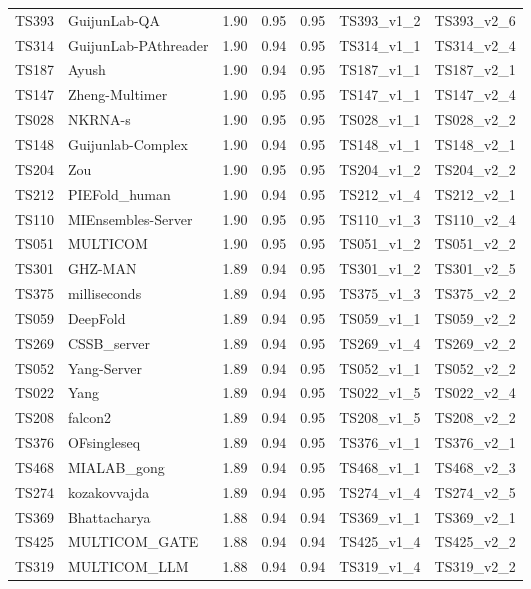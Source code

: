 \begin{longtable}{lllllll}
TS393 & GuijunLab-QA & 1.90 & 0.95 & 0.95 & TS393\_v1\_2 & TS393\_v2\_6 \\ 
TS314 & GuijunLab-PAthreader & 1.90 & 0.94 & 0.95 & TS314\_v1\_1 & TS314\_v2\_4 \\ 
TS187 & Ayush & 1.90 & 0.94 & 0.95 & TS187\_v1\_1 & TS187\_v2\_1 \\ 
TS147 & Zheng-Multimer & 1.90 & 0.95 & 0.95 & TS147\_v1\_1 & TS147\_v2\_4 \\ 
TS028 & NKRNA-s & 1.90 & 0.95 & 0.95 & TS028\_v1\_1 & TS028\_v2\_2 \\ 
TS148 & Guijunlab-Complex & 1.90 & 0.94 & 0.95 & TS148\_v1\_1 & TS148\_v2\_1 \\ 
TS204 & Zou & 1.90 & 0.95 & 0.95 & TS204\_v1\_2 & TS204\_v2\_2 \\ 
TS212 & PIEFold\_human & 1.90 & 0.94 & 0.95 & TS212\_v1\_4 & TS212\_v2\_1 \\ 
TS110 & MIEnsembles-Server & 1.90 & 0.95 & 0.95 & TS110\_v1\_3 & TS110\_v2\_4 \\ 
TS051 & MULTICOM & 1.90 & 0.95 & 0.95 & TS051\_v1\_2 & TS051\_v2\_2 \\ 
TS301 & GHZ-MAN & 1.89 & 0.94 & 0.95 & TS301\_v1\_2 & TS301\_v2\_5 \\ 
TS375 & milliseconds & 1.89 & 0.94 & 0.95 & TS375\_v1\_3 & TS375\_v2\_2 \\ 
TS059 & DeepFold & 1.89 & 0.94 & 0.95 & TS059\_v1\_1 & TS059\_v2\_2 \\ 
TS269 & CSSB\_server & 1.89 & 0.94 & 0.95 & TS269\_v1\_4 & TS269\_v2\_2 \\ 
TS052 & Yang-Server & 1.89 & 0.94 & 0.95 & TS052\_v1\_1 & TS052\_v2\_2 \\ 
TS022 & Yang & 1.89 & 0.94 & 0.95 & TS022\_v1\_5 & TS022\_v2\_4 \\ 
TS208 & falcon2 & 1.89 & 0.94 & 0.95 & TS208\_v1\_5 & TS208\_v2\_2 \\ 
TS376 & OFsingleseq & 1.89 & 0.94 & 0.95 & TS376\_v1\_1 & TS376\_v2\_1 \\ 
TS468 & MIALAB\_gong & 1.89 & 0.94 & 0.95 & TS468\_v1\_1 & TS468\_v2\_3 \\ 
TS274 & kozakovvajda & 1.89 & 0.94 & 0.95 & TS274\_v1\_4 & TS274\_v2\_5 \\ 
TS369 & Bhattacharya & 1.88 & 0.94 & 0.94 & TS369\_v1\_1 & TS369\_v2\_1 \\ 
TS425 & MULTICOM\_GATE & 1.88 & 0.94 & 0.94 & TS425\_v1\_4 & TS425\_v2\_2 \\ 
TS319 & MULTICOM\_LLM & 1.88 & 0.94 & 0.94 & TS319\_v1\_4 & TS319\_v2\_2 \\ 

\end{longtable}
